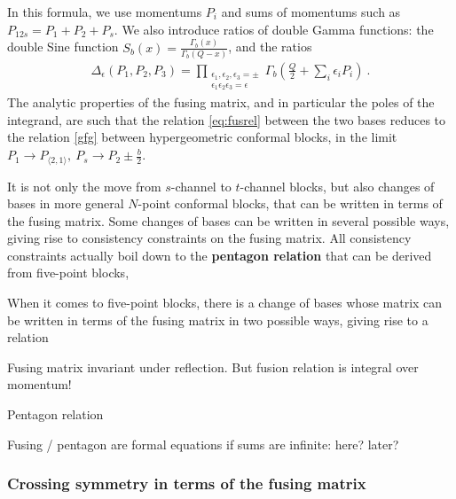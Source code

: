 \documentclass[12pt, a4paper, notitlepage, twoside]{report}
\numberwithin{equation}{section}
\theoremstyle{break}
\begin{document}
In this formula, we use momentums $P_i$ and sums of momentums such as $P_{12s}=P_1+P_2+P_s$. We also introduce ratios of double Gamma functions: the double Sine function $S_b(x) = \frac{\Gamma_b(x)}{\Gamma_b(Q-x)}$, and the ratios 
\begin{align}
 \Delta_\epsilon(P_1,P_2,P_3) =\prod_{\substack{\epsilon_1,\epsilon_2,\epsilon_3=\pm \\ \epsilon_1\epsilon_2\epsilon_3=\epsilon}} \Gamma_b\left(\tfrac{Q}{2}+\textstyle{\sum}_i\epsilon_iP_i\right)\ .
\end{align}
The analytic properties of the fusing matrix, and in particular the poles of the integrand, are such that the relation \eqref{eq:fusrel} between the two bases reduces to the relation \eqref{gfg} between hypergeometric conformal blocks, in the limit $P_1\to P_{\langle 2,1\rangle},\ P_s\to P_2 \pm \frac{b}{2}$.

It is not only the move from $s$-channel to $t$-channel blocks, but also changes of bases in more general $N$-point conformal blocks, that can be written in terms of the fusing matrix. Some changes of bases can be written in several possible ways, giving rise to consistency constraints on the fusing matrix. All consistency constraints actually boil down to the \textbf{pentagon relation} that can be derived from five-point blocks, 

When it comes to five-point blocks, there is a change of bases whose matrix can be written in terms of the fusing matrix in two possible ways, giving rise to a relation 

Fusing matrix invariant under reflection. But fusion relation is integral over momentum!

Pentagon relation

Fusing / pentagon are formal equations if sums are infinite: here? later? 
 
\subsubsection{Crossing symmetry in terms of the fusing matrix}
\end{document}
